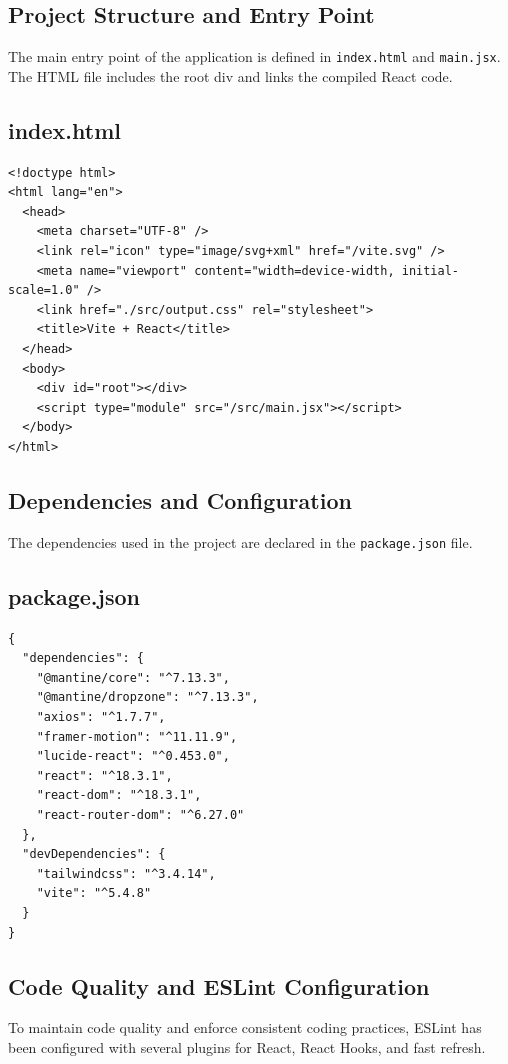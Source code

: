 \documentclass[12pt]{report}
\begin{document}
\subsection{Project Structure and Entry Point}

The main entry point of the application is defined in \verb|index.html| and \verb|main.jsx|. The HTML file includes the root div and links the compiled React code.

\subsection*{index.html}
\begin{verbatim}
<!doctype html>
<html lang="en">
  <head>
    <meta charset="UTF-8" />
    <link rel="icon" type="image/svg+xml" href="/vite.svg" />
    <meta name="viewport" content="width=device-width, initial-scale=1.0" />
    <link href="./src/output.css" rel="stylesheet">
    <title>Vite + React</title>
  </head>
  <body>
    <div id="root"></div>
    <script type="module" src="/src/main.jsx"></script>
  </body>
</html>
\end{verbatim}

\subsection{Dependencies and Configuration}

The dependencies used in the project are declared in the \verb|package.json| file.

\subsection*{package.json}
\begin{verbatim}
{
  "dependencies": {
    "@mantine/core": "^7.13.3",
    "@mantine/dropzone": "^7.13.3",
    "axios": "^1.7.7",
    "framer-motion": "^11.11.9",
    "lucide-react": "^0.453.0",
    "react": "^18.3.1",
    "react-dom": "^18.3.1",
    "react-router-dom": "^6.27.0"
  },
  "devDependencies": {
    "tailwindcss": "^3.4.14",
    "vite": "^5.4.8"
  }
}
\end{verbatim}

\subsection{Code Quality and ESLint Configuration}

To maintain code quality and enforce consistent coding practices, ESLint has been configured with several plugins for React, React Hooks, and fast refresh.
\end{document}
